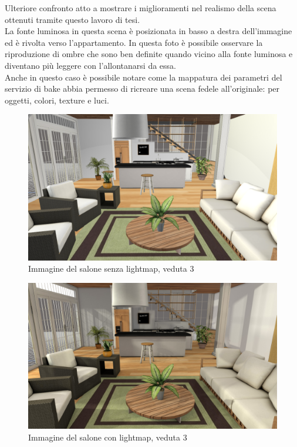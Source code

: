Ulteriore confronto atto a mostrare i miglioramenti nel realismo della scena ottenuti tramite questo lavoro di tesi.
\\
La fonte luminosa in questa scena è posizionata in basso a destra dell’immagine ed è rivolta verso l’appartamento. In questa foto è possibile osservare la riproduzione di ombre che sono ben definite quando vicino alla fonte luminosa e diventano più leggere con l’allontanarsi da essa.
\\
Anche in questo caso è possibile notare come la mappatura dei parametri del servizio di bake abbia permesso di ricreare una scena fedele all’originale: per oggetti, colori, texture e luci.
\begin{figure}[htb]
 \centering
 \includegraphics[width=1\linewidth]{images/chapter_prove_sperimentali/salone_camino_nobake.png}\hfill
 \caption[Salone senza lightmap, veduta 3]{Immagine del salone senza lightmap, veduta 3}
 \label{fig:prove_sperimentali_navigatore_scale_nobake}
\end{figure}
\begin{figure}[htb]
 \centering
 \includegraphics[width=1\linewidth]{images/chapter_prove_sperimentali/salone_camino_bake.png}\hfill
 \caption[Salone con lightmap, veduta 3]{Immagine del salone con lightmap, veduta 3}
 \label{fig:prove_sperimentali_navigatore_scale_bake}
\end{figure}
